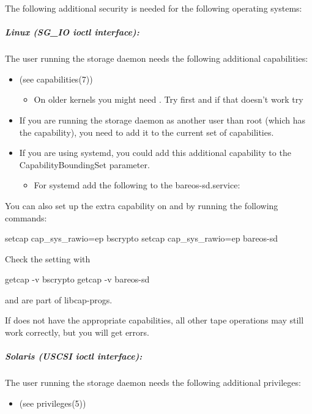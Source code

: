 The following additional security is needed for the following operating systems:

\subparagraph{Linux (SG\_IO ioctl interface):} The user running the storage daemon needs the following additional capabilities:

\begin{itemize}
 \item {} (see capabilities(7))
 \begin{itemize}
  \item On older kernels you might need . Try  first and if that doesn't work try 
 \end{itemize}
 \item If you are running the storage daemon as another user than root (which has the  capability), you need to add it to the current set of capabilities.
 \item If you are using systemd, you could add this additional capability to the CapabilityBoundingSet parameter.
 \begin{itemize}
  \item For systemd add the following to the bareos-sd.service: 
 \end{itemize}
\end{itemize}

You can also set up the extra capability on  and  by running the following commands:

\begin{commands}{}
setcap cap_sys_rawio=ep bscrypto
setcap cap_sys_rawio=ep bareos-sd
\end{commands}

Check the setting with

\begin{commands}{}
getcap -v bscrypto
getcap -v bareos-sd
\end{commands}

 and  are part of libcap-progs.

If  does not have the appropriate capabilities, all
other tape operations may still work correctly, but you will
get  errors.



\subparagraph{Solaris (USCSI ioctl interface):} The user running the storage daemon needs the following additional privileges:
\begin{itemize}
 \item {} (see privileges(5))
\end{itemize}

